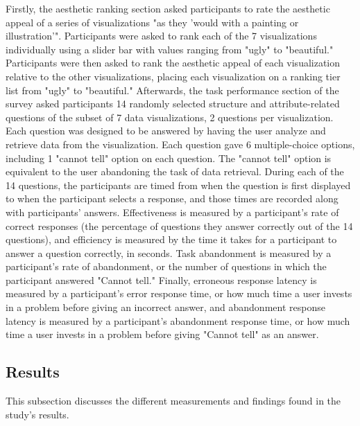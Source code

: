\documentclass[twocolumn]{article}
\newcommand{\forceindent}{\leavevmode{\parindent=2em\indent}}
\begin{document}
		\forceindent Firstly, the aesthetic ranking section asked participants to rate the aesthetic appeal of a series of visualizations "as they 'would with a painting or illustration'". Participants were asked to rank each of the 7 visualizations individually using a slider bar with values ranging from "ugly" to "beautiful." Participants were then asked to rank the aesthetic appeal of each visualization relative to the other visualizations, placing each visualization on a ranking tier list from "ugly" to "beautiful." Afterwards, the task performance section of the survey asked participants 14 randomly selected structure and attribute-related questions of the subset of 7 data visualizations, 2 questions per visualization. Each question was designed to be answered by having the user analyze and retrieve data from the visualization. Each question gave 6 multiple-choice options, including 1 "cannot tell" option on each question. The "cannot tell" option is equivalent to the user abandoning the task of data retrieval. During each of the 14 questions, the participants are timed from when the question is first displayed to when the participant selects a response, and those times are recorded along with participants' answers. Effectiveness is measured by a participant's rate of correct responses (the percentage of questions they answer correctly out of the 14 questions), and efficiency is measured by the time it takes for a participant to answer a question correctly, in seconds. Task abandonment is measured by a participant's rate of abandonment, or the number of questions in which the participant answered "Cannot tell." Finally, erroneous response latency is measured by a participant's error response time, or how much time a user invests in a problem before giving an incorrect answer, and abandonment response latency is measured by a participant's abandonment response time, or how much time a user invests in a problem before giving "Cannot tell" as an answer.

		\subsection{Results}\forceindent This subsection discusses the different measurements and findings found in the study's results.
		
\end{document}
